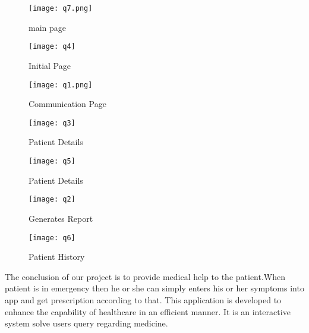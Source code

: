 \documentclass[a4paper,twoside]{report}
\begin{document}
			\begin{figure}
			\centering
			\texttt{[image: q7.png]}
			\caption{main page}
			\label{fig:q7}
		\end{figure}


	\begin{figure}
	\centering
	\texttt{[image: q4]}
	\caption{Initial Page}
	\label{fig:q4}
\end{figure}


\begin{figure}
	\centering
	\texttt{[image: q1.png]}
	\caption{Communication Page}
	\label{fig:q1}
\end{figure}

\begin{figure}
	\centering
	\texttt{[image: q3]}
	\caption{Patient Details}
	\label{fig:q3}
\end{figure}

\begin{figure}
	\centering
	\texttt{[image: q5]}
	\caption{Patient Details}
	\label{fig:q5}
\end{figure}

\begin{figure}
	\centering
	\texttt{[image: q2]}
	\caption{Generates Report}
	\label{fig:q2}
\end{figure}

	\begin{figure}
		\centering
		\texttt{[image: q6]}
		\caption{Patient History}
		\label{fig:q6}
	\end{figure}

\newpage
\begin{center}
	\par The conclusion of our project is to provide medical help to the patient.When patient is in emergency then he or she can  simply enters his or her symptoms into app and get prescription according to that. This application is developed to enhance the capability of healthcare in an efficient manner. It is an interactive system solve users query regarding medicine.
\end{center}
				
\end{document}
